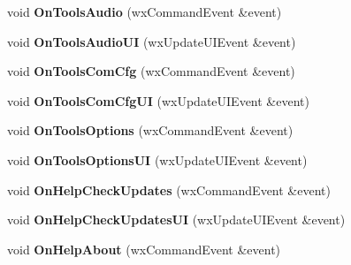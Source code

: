 \begin{DoxyCompactItemize}
\item 
\hypertarget{classfdmdv2_top_frame_a7a538e085978ad3062cfde21fa932ec4}{void {\bfseries On\-Tools\-Audio} (wx\-Command\-Event \&event)}\label{classfdmdv2_top_frame_a7a538e085978ad3062cfde21fa932ec4}

\item 
\hypertarget{classfdmdv2_top_frame_a6138a06447129f36c71c7869ce83c90d}{void {\bfseries On\-Tools\-Audio\-U\-I} (wx\-Update\-U\-I\-Event \&event)}\label{classfdmdv2_top_frame_a6138a06447129f36c71c7869ce83c90d}

\item 
\hypertarget{classfdmdv2_top_frame_affe4a50628fe0c30a31578842d75caa4}{void {\bfseries On\-Tools\-Com\-Cfg} (wx\-Command\-Event \&event)}\label{classfdmdv2_top_frame_affe4a50628fe0c30a31578842d75caa4}

\item 
\hypertarget{classfdmdv2_top_frame_ad67765b1be6f6aa759128418cd990a57}{void {\bfseries On\-Tools\-Com\-Cfg\-U\-I} (wx\-Update\-U\-I\-Event \&event)}\label{classfdmdv2_top_frame_ad67765b1be6f6aa759128418cd990a57}

\item 
\hypertarget{classfdmdv2_top_frame_a6bf565f4dca69f694533b517d3a0d2e2}{void {\bfseries On\-Tools\-Options} (wx\-Command\-Event \&event)}\label{classfdmdv2_top_frame_a6bf565f4dca69f694533b517d3a0d2e2}

\item 
\hypertarget{classfdmdv2_top_frame_a73a65fd3008330ad3059b5100e389c72}{void {\bfseries On\-Tools\-Options\-U\-I} (wx\-Update\-U\-I\-Event \&event)}\label{classfdmdv2_top_frame_a73a65fd3008330ad3059b5100e389c72}

\item 
\hypertarget{classfdmdv2_top_frame_a1323384ebf5b3b473a00847b633354be}{void {\bfseries On\-Help\-Check\-Updates} (wx\-Command\-Event \&event)}\label{classfdmdv2_top_frame_a1323384ebf5b3b473a00847b633354be}

\item 
\hypertarget{classfdmdv2_top_frame_ae4270eada2afe33666ab0aee83a26c2b}{void {\bfseries On\-Help\-Check\-Updates\-U\-I} (wx\-Update\-U\-I\-Event \&event)}\label{classfdmdv2_top_frame_ae4270eada2afe33666ab0aee83a26c2b}

\item 
\hypertarget{classfdmdv2_top_frame_ad8684e7e8b0e4b67d7d770ed71a72673}{void {\bfseries On\-Help\-About} (wx\-Command\-Event \&event)}\label{classfdmdv2_top_frame_ad8684e7e8b0e4b67d7d770ed71a72673}


\end{DoxyCompactItemize}
